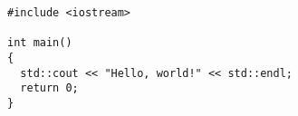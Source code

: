 \documentclass{article}
\begin{document}
\begin{lstlisting}
#include <iostream>

int main()
{
  std::cout << "Hello, world!" << std::endl;
  return 0;
}
\end{lstlisting}
\end{document}
